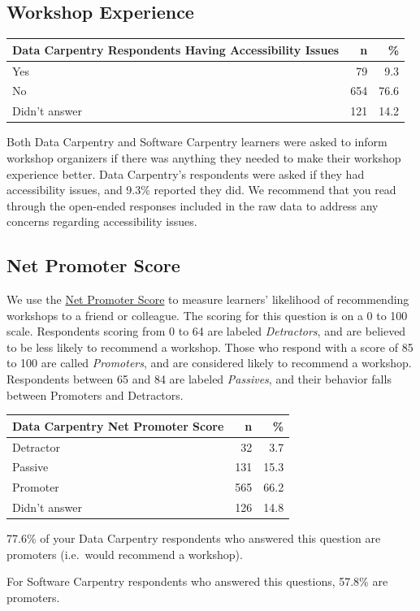 \documentclass[]{article}
\begin{document}
\subsection{Workshop Experience}\label{workshop-experience}

\begin{longtable}[]{@{}lrr@{}}
\toprule
Data Carpentry Respondents Having Accessibility Issues & n &
\%\tabularnewline
\midrule
\endhead
Yes & 79 & 9.3\tabularnewline
No & 654 & 76.6\tabularnewline
Didn't answer & 121 & 14.2\tabularnewline
\bottomrule
\end{longtable}

Both Data Carpentry and Software Carpentry learners were asked to inform
workshop organizers if there was anything they needed to make their
workshop experience better. Data Carpentry's respondents were asked if
they had accessibility issues, and 9.3\% reported they did. We recommend
that you read through the open-ended responses included in the raw data
to address any concerns regarding accessibility issues.

\subsection{Net Promoter Score}\label{net-promoter-score}

We use the \href{https://en.wikipedia.org/wiki/Net_Promoter}{Net
Promoter Score} to measure learners' likelihood of recommending
workshops to a friend or colleague. The scoring for this question is on
a 0 to 100 scale. Respondents scoring from 0 to 64 are labeled
\emph{Detractors}, and are believed to be less likely to recommend a
workshop. Those who respond with a score of 85 to 100 are called
\emph{Promoters}, and are considered likely to recommend a workshop.
Respondents between 65 and 84 are labeled \emph{Passives}, and their
behavior falls between Promoters and Detractors.

\begin{longtable}[]{@{}lrr@{}}
\toprule
Data Carpentry Net Promoter Score & n & \%\tabularnewline
\midrule
\endhead
Detractor & 32 & 3.7\tabularnewline
Passive & 131 & 15.3\tabularnewline
Promoter & 565 & 66.2\tabularnewline
Didn't answer & 126 & 14.8\tabularnewline
\bottomrule
\end{longtable}

77.6\% of your Data Carpentry respondents who answered this question are
promoters (i.e.~would recommend a workshop).

For Software Carpentry respondents who answered this questions, 57.8\%
are promoters.
\end{document}
